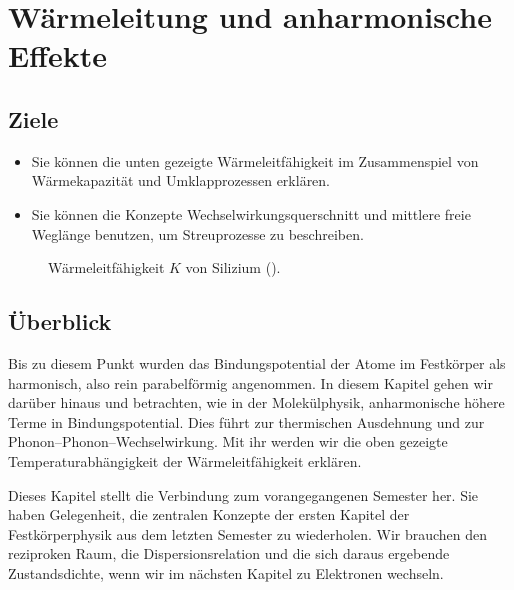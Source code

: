\renewcommand{\chapterauthors}{Markus Lippitz}
\renewcommand{\lastmod}{4. April 2023}

\chapter{Wärmeleitung und anharmonische Effekte}




\section{Ziele}
 


\begin{itemize}
\item Sie können die unten gezeigte Wärmeleitfähigkeit im Zusammenspiel von Wärmekapazität und Umklapprozessen erklären.
\item Sie können die Konzepte Wechselwirkungsquerschnitt und mittlere freie Weglänge benutzen, um Streuprozesse zu beschreiben.

\end{itemize}


\begin{figure}
    \caption{Wärmeleitfähigkeit $K$  von Silizium (\cite{Glassbrenner1964}).}
    \label{fig:1_WL_Si}
\end{figure}
 

\section{Überblick}

Bis zu diesem Punkt wurden das Bindungspotential der Atome im Festkörper als harmonisch, also rein parabelförmig angenommen. In diesem Kapitel gehen wir darüber hinaus und betrachten, wie in der Molekülphysik, anharmonische höhere Terme in Bindungspotential. Dies führt zur thermischen Ausdehnung und zur  Phonon--Phonon--Wechselwirkung. Mit ihr werden wir die oben gezeigte Temperaturabhängigkeit der Wärmeleitfähigkeit erklären.

Dieses Kapitel stellt die Verbindung zum vorangegangenen Semester her. Sie haben Gelegenheit, die zentralen Konzepte der ersten Kapitel der Festkörperphysik aus dem letzten Semester zu wiederholen. Wir brauchen den reziproken Raum, die Dispersionsrelation und die sich daraus ergebende Zustandsdichte, wenn wir im nächsten Kapitel zu Elektronen wechseln.


